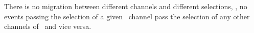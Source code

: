 There is no migration between different channels and different selections, \ie, no events passing the selection of a given \tHq\ channel pass the selection of any other channels of \ttH\ and vice versa.

\begin{table}[h!]
\centering

\end{table}
